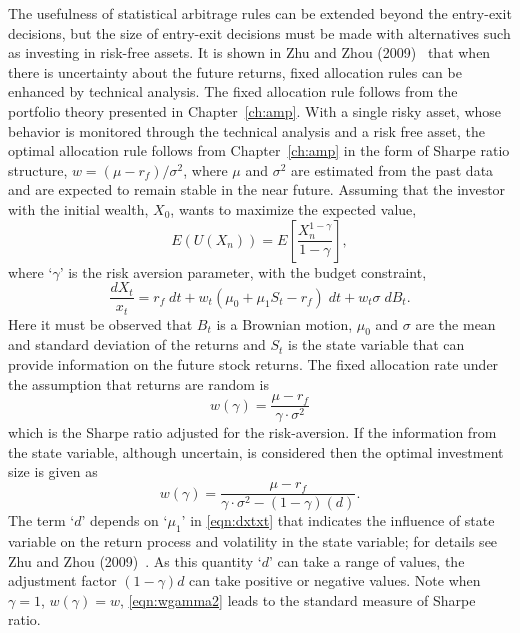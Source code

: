 The usefulness of statistical arbitrage rules can be extended beyond the entry-exit decisions, but the size of entry-exit decisions must be made with alternatives such as investing in risk-free assets. It is shown in Zhu and Zhou (2009)~\cite{zhuzhou09} that when there is uncertainty about the future returns, fixed allocation rules can be enhanced by technical analysis. The fixed allocation rule follows from the portfolio theory presented in Chapter~\ref{ch:amp}. With a single risky asset, whose behavior is monitored through the technical analysis and a risk free asset, the optimal allocation rule follows from Chapter~\ref{ch:amp} in the form of Sharpe ratio structure, $w= (\mu - r_f)/\sigma^2$, where $\mu$ and $\sigma^2$ are estimated from the past data and are expected to remain stable in the near future. Assuming that the investor with the initial wealth, $X_0$, wants to maximize the expected value,
	\begin{equation} \label{eqn:euxn}
	E(U(X_n))= E \left[ \dfrac{X_n^{1-\gamma}}{1 - \gamma}\right],
	\end{equation}
where `$\gamma$' is the risk aversion parameter, with the budget constraint,
	\begin{equation} \label{eqn:dxtxt}
	\dfrac{dX_t}{x_t}= r_f \; dt + w_t (\mu_0 + \mu_1 S_t - r_f) \; dt + w_t \sigma \; dB_t.
	\end{equation}
Here it must be observed that $B_t$ is a Brownian motion, $\mu_0$ and $\sigma$ are the mean and standard deviation of the returns and $S_t$ is the state variable that can provide information on the future stock returns. The fixed allocation rate under the assumption that returns are random is
	\begin{equation} \label{eqn:wgamma}
	w(\gamma)= \dfrac{\mu - r_f}{\gamma \cdot \sigma^2}
	\end{equation}
which is the Sharpe ratio adjusted for the risk-aversion. If the information from the state variable, although uncertain, is considered then the optimal investment size is given as
	\begin{equation} \label{eqn:wgamma2}
	w(\gamma)= \dfrac{\mu - r_f}{\gamma \cdot \sigma^2 - (1-\gamma)(d)}.
	\end{equation}
The term `$d$' depends on `$\mu_1$' in \eqref{eqn:dxtxt} that indicates the influence of state variable on the return process and volatility in the state variable; for details see Zhu and Zhou (2009)~\cite{zhuzhou09}. As this quantity `$d$' can take a range of values, the adjustment factor $(1-\gamma)d$ can take positive or negative values. Note when $\gamma=1$, $w(\gamma)= w$, \eqref{eqn:wgamma2} leads to the standard measure of Sharpe ratio. 


